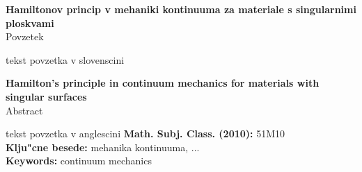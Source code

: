 \begin{center}
{\bf Hamiltonov princip v mehaniki kontinuuma za materiale s singularnimi ploskvami}\\[3mm]
{\sc Povzetek}
\end{center}
tekst povzetka v slovenscini
\vfill
\begin{center}
{\bf Hamilton's principle in continuum mechanics for materials with singular surfaces}\\[3mm]
{\sc Abstract}
\end{center}
tekst povzetka v anglescini
\vfill\noindent
{\bf Math. Subj. Class. (2010):} 51M10  \\[1mm]  
{\bf Klju"cne besede:} mehanika kontinuuma, ... \\[1mm]  
{\bf Keywords:} continuum mechanics